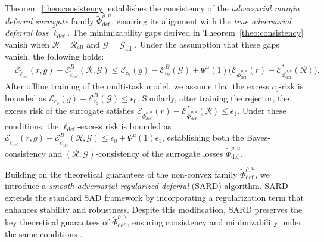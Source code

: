 Theorem~\ref{theo:consistency} establishes the consistency of the \textit{adversarial margin deferral surrogate} family \( \widetilde{\Phi}^{\rho, u}_{\text{def}} \), ensuring its alignment with the \textit{true adversarial deferral loss} \( \widetilde{\ell}_{\text{def}} \). The minimizability gaps derived in Theorem~\ref{theo:consistency} vanish  when \(\mathcal{R} = \mathcal{R}_{\text{all}}\) and \(\mathcal{G} = \mathcal{G}_{\text{all}}\) \citep{Steinwart2007HowTC, Awasthi_Mao_Mohri_Zhong_2022_multi}. Under the assumption that these gaps vanish, the following holds:
\begin{equation}
    \begin{aligned}
        & \mathcal{E}_{\widetilde{\ell}_{\text{def}}}(r, g) - \mathcal{E}_{\widetilde{\ell}_{\text{def}}}^B(\mathcal{R}, \mathcal{G}) \leq \mathcal{E}_{c_0}(g) - \mathcal{E}_{c_0}^B(\mathcal{G}) + \Psi^u(1) \Big( \mathcal{E}_{\widetilde{\Phi}^{\rho, u}_{\text{def}}}(r) - \mathcal{E}_{\widetilde{\Phi}^{\rho, u}_{\text{def}}}^\ast(\mathcal{R})\Big).
    \end{aligned}
\end{equation}
After offline training of the multi-task model, we assume that the excess \( c_0 \)-risk is bounded as \( \mathcal{E}_{c_0}(g) - \mathcal{E}_{c_0}^B(\mathcal{G}) \leq \epsilon_0 \). Similarly, after training the rejector, the excess risk of the surrogate satisfies \( \mathcal{E}_{\widetilde{\Phi}^{\rho, u}_{\text{def}}}(r) - \mathcal{E}_{\widetilde{\Phi}^{\rho, u}_{\text{def}}}^\ast(\mathcal{R}) \leq \epsilon_1 \). Under these conditions, the \(\ell_{\text{def}}\)-excess risk is bounded as \( \mathcal{E}_{\widetilde{\ell}_{\text{def}}}(r, g) - \mathcal{E}_{\widetilde{\ell}_{\text{def}}}^B(\mathcal{R}, \mathcal{G}) \leq \epsilon_0 + \Psi^u(1) \epsilon_1 \), establishing both the Bayes-consistency and \((\mathcal{R}, \mathcal{G})\)-consistency of the surrogate losses \( \widetilde{\Phi}^{\rho, u}_{\text{def}} \).

Building on the theoretical guarantees of the non-convex family \( \widetilde{\Phi}^{\rho, u}_{\text{def}} \), we introduce a \textit{smooth adversarial regularized deferral} (SARD) algorithm. SARD extends the standard SAD framework by incorporating a regularization term that enhances stability and robustness. Despite this modification, SARD preserves the key theoretical guarantees of \( \widetilde{\Phi}^{\rho, u}_{\text{def}} \), ensuring consistency and minimizability under the same conditions \citep{mao2023crossentropylossfunctionstheoretical, Grounded}.

